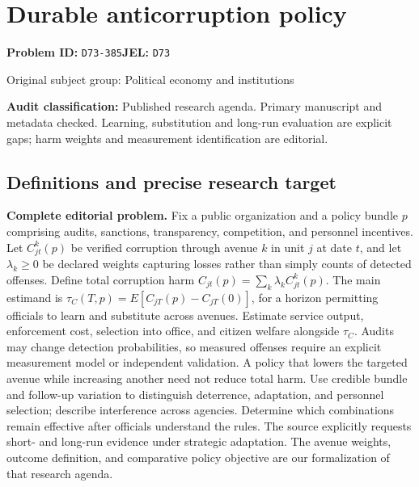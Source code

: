 \documentclass[11pt,a4paper]{article}
\begin{document}
\section*{Durable anticorruption policy}
\textbf{Problem ID:} \texttt{D73-385}\quad \textbf{JEL:} \texttt{D73}\par
\label{problem:OP-0383}
{\sffamily\small\color{muted}Original subject group: Political economy and institutions\par}
\label{definitions:problem:30007665}
\textbf{Audit classification:} Published research agenda. Primary manuscript and metadata checked. Learning, substitution and long-run evaluation are explicit gaps; harm weights and measurement identification are editorial.
\subsection*{Definitions and precise research target}
\textbf{Complete editorial problem.} Fix a public organization and a policy bundle \(p\) comprising audits, sanctions, transparency, competition, and personnel incentives. Let \(C^k_{jt}(p)\) be verified corruption through avenue \(k\) in unit \(j\) at date \(t\), and let \(\lambda_k\ge0\) be declared weights capturing losses rather than simply counts of detected offenses. Define total corruption harm \(C_{jt}(p)=\sum_k\lambda_kC^k_{jt}(p)\). The main estimand is \(\tau_C(T,p)=E[C_{jT}(p)-C_{jT}(0)]\), for a horizon permitting officials to learn and substitute across avenues. Estimate service output, enforcement cost, selection into office, and citizen welfare alongside \(\tau_C\). Audits may change detection probabilities, so measured offenses require an explicit measurement model or independent validation. A policy that lowers the targeted avenue while increasing another need not reduce total harm. Use credible bundle and follow-up variation to distinguish deterrence, adaptation, and personnel selection; describe interference across agencies. Determine which combinations remain effective after officials understand the rules. The source explicitly requests short- and long-run evidence under strategic adaptation. The avenue weights, outcome definition, and comparative policy objective are our formalization of that research agenda.
\end{document}
